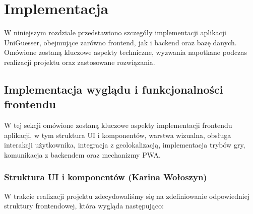 \chapter{Implementacja}
\label{chap:implementation}

W niniejszym rozdziale przedstawiono szczegóły implementacji aplikacji UniGuesser, obejmujące zarówno frontend, jak i backend oraz bazę danych. Omówione zostaną kluczowe aspekty techniczne, wyzwania napotkane podczas realizacji projektu oraz zastosowane rozwiązania.

\section{Implementacja wyglądu i funkcjonalności frontendu}

W tej sekcji omówione zostaną kluczowe aspekty implementacji frontendu aplikacji, w tym struktura UI i komponentów, warstwa wizualna, obsługa interakcji użytkownika, integracja z geolokalizacją, implementacja trybów gry, komunikacja z backendem oraz mechanizmy PWA.

\subsection{Struktura UI i komponentów (Karina Wołoszyn)}

W trakcie realizacji projektu zdecydowaliśmy się na zdefiniowanie odpowiedniej struktury frontendowej, która wygląda następująco:

